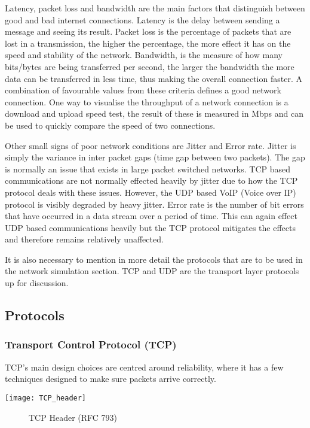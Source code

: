 Latency, packet loss and bandwidth are the main factors that distinguish between good and bad internet connections. Latency is the delay between sending a message and seeing its result. Packet loss is the percentage of packets that are lost in a transmission, the higher the percentage, the more effect it has on the speed and stability of the network. Bandwidth, is the measure of how many bits/bytes are being transferred per second, the larger the bandwidth the more data can be transferred in less time, thus making the overall connection faster. A combination of favourable values from these criteria defines a good network connection. One way to visualise the throughput of a network connection is a download and upload speed test, the result of these is measured in Mbps and can be used to quickly compare the speed of two connections.

Other small signs of poor network conditions are Jitter and Error rate. Jitter is simply the variance in inter packet gaps (time gap between two packets). The gap is normally an issue that exists in large packet switched networks. TCP based communications are not normally effected heavily by jitter due to how the TCP protocol deals with these issues. However, the UDP based VoIP (Voice over IP) protocol is visibly degraded by heavy jitter. Error rate is the number of bit errors that have occurred in a data stream over a period of time. This can again effect UDP based communications heavily but the TCP protocol mitigates the effects and therefore remains relatively unaffected.

It is also necessary to mention in more detail the protocols that are to be used in the network simulation section. TCP \citep{TCP} and UDP \citep{UDP} are the transport layer protocols up for discussion. 

\clearpage
\subsection{Protocols}
\subsubsection{Transport Control Protocol (TCP)}
TCP's main design choices are centred around reliability, where it has a few techniques designed to make sure packets arrive correctly. 


\begin{center}
	\texttt{[image: TCP\_header]}
	\begin{figure}[h]
		\caption{TCP Header (RFC 793)}
	\end{figure}	
\end{center}

